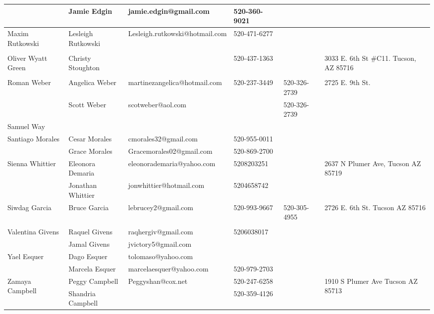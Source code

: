 \documentclass[landscape]{article}\usepackage[]{graphicx}\usepackage[]{color}
\begin{document}
\begin{longtable}{|p{100pt}|p{100pt}|p{140pt}|p{60pt}|p{64pt}|p{120pt}|}
 & Jamie Edgin & jamie.edgin@gmail.com & 520-360-9021 &  & \\
\hline
\multirow{2}{100pt}{Maxim Rutkowski} & Lesleigh Rutkowski  & Lesleigh.rutkowski@hotmail.com & 520-471-6277 &  & \multirow{2}{120pt}{} \\
 &  &  &  &  & \\
\hline
\multirow{2}{100pt}{Oliver Wyatt Green} & Christy Stoughton &  & 520-437-1363 &  & \multirow{2}{120pt}{3033 E. 6th St \#C11. Tucson, AZ 85716} \\
 &  &  &  &  & \\
\hline
\multirow{2}{100pt}{Roman Weber} & Angelica Weber & martinezangelica@hotmail.com & 520-237-3449 & 520-326-2739 & \multirow{2}{120pt}{2725 E. 9th St.} \\
 & Scott Weber & scotweber@aol.com &  & 520-326-2739 & \\
\hline
\multirow{2}{100pt}{Samuel Way} &  &  &  &  & \multirow{2}{120pt}{} \\
 &  &  &  &  & \\
\hline
\multirow{2}{100pt}{Santiago Morales} & Cesar Morales & cmorales32@gmail.com & 520-955-0011 &  & \multirow{2}{120pt}{} \\
 & Grace Morales  & Gracemorales02@gmail.com & 520-869-2700 &  & \\
\hline
\multirow{2}{100pt}{Sienna Whittier} & Eleonora Demaria & eleonorademaria@yahoo.com & 5208203251 &  & \multirow{2}{120pt}{2637 N Plumer Ave, Tucson AZ 85719} \\
 & Jonathan Whittier & jonwhittier@hotmail.com & 5204658742 &  & \\
\hline
\multirow{2}{100pt}{Siwdag Garcia} & Bruce Garcia & lebrucey2@gmail.com & 520-993-9667 & 520-305-4955 & \multirow{2}{120pt}{2726 E. 6th St. Tucson AZ 85716} \\
 &  &  &  &  & \\
\hline
\multirow{2}{100pt}{Valentina Givens} & Raquel Givens & raqhergiv@gmail.com & 5206038017 &  & \multirow{2}{120pt}{} \\
 & Jamal Givens & jvictory5@gmail.com &  &  & \\
\hline
\multirow{2}{100pt}{Yael Esquer} & Dago Esquer & tolomaso@yahoo.com &  &  & \multirow{2}{120pt}{} \\
 & Marcela Esquer & marcelaesquer@yahoo.com & 520-979-2703 &  & \\
\hline
\multirow{2}{100pt}{Zamaya Campbell} & Peggy Campbell  & Peggyshan@cox.net & 520-247-6258 &  & \multirow{2}{120pt}{1910 S Plumer Ave Tucson AZ 85713} \\
 & Shandria Campbell  &  & 520-359-4126 &  & \\
\hline
\end{longtable}
\newpage
\end{document}
